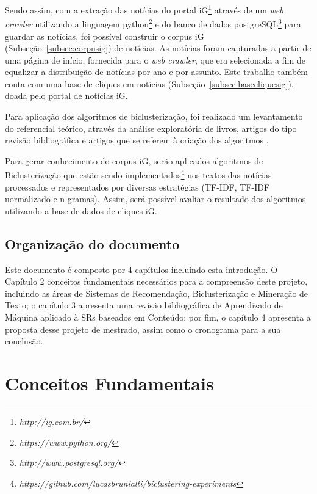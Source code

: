 \documentclass[normaltoc, espacoumemeio, pnumromarab,ruledheader]{abnt}
\begin{document}
Sendo assim, com a extração das notícias do portal iG\footnote{\textit{http://ig.com.br/}} através de um \textit{web crawler} utilizando a linguagem python\footnote{\textit{https://www.python.org/}} e do banco de dados postgreSQL\footnote{\textit{http://www.postgresql.org/}} para guardar as notícias, foi possível construir o corpus iG (Subseção~\ref{subsec:corpusig}) de notícias.
As notícias foram capturadas a partir de uma página de início, fornecida para o \textit{web crawler}, que era selecionada a fim de equalizar a distribuição de notícias por ano e por assunto. Este trabalho também conta com uma base de cliques em notícias (Subseção~\ref{subsec:basecliquesig}), doada pelo portal de notícias iG.

Para aplicação dos algoritmos de biclusterização, foi realizado um levantamento do referencial teórico, através da análise exploratória de livros, artigos do tipo revisão bibliográfica e artigos que se referem à criação dos algoritmos \cite{Cheng2000,Tanay2005,Madeira2004,Santamaria2007,Kluger2003,Prelic2006}.

Para gerar conhecimento do corpus iG, serão aplicados algoritmos de Biclusterização que estão sendo implementados\footnote{\textit{https://github.com/lucasbrunialti/biclustering-experiments}} nos textos das notícias processados e representados por diversas estratégias (TF-IDF, TF-IDF normalizado e n-gramas). Assim, será possível avaliar o resultado dos algoritmos utilizando a base de dados de cliques iG.

\section{Organização do documento}

Este documento é composto por 4 capítulos incluindo esta introdução. O Capítulo 2 conceitos fundamentais necessários para a compreensão deste projeto, incluindo as áreas de Sistemas de Recomendação, Biclusterização e Mineração de Texto; o capítulo 3 apresenta uma revisão bibliográfica de Aprendizado de Máquina aplicado à SRs baseados em Conteúdo; por fim, o capítulo 4 apresenta a proposta desse projeto de mestrado, assim como o cronograma para a sua conclusão.

\chapter{Conceitos Fundamentais}
\end{document}
